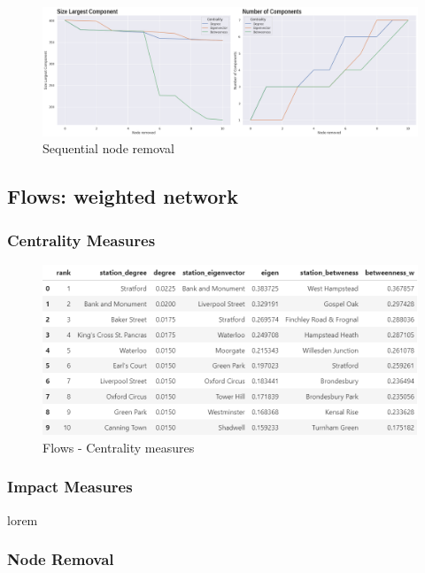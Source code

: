 \documentclass[10pt]{report}
\numberwithin{figure}{section}
\numberwithin{table}{section}
\begin{document}
    \begin{figure}[htp]
        \centering
        \includegraphics[width=16cm]{Image/Part1_sequential_Summarise.png}
        \caption{Sequential node removal}
        \label{fig:galaxy}
    \end{figure}


\newpage

\subsection{Flows: weighted network} 

\subsubsection{Centrality Measures } 

    \begin{figure}[htp]
        \centering
        \includegraphics[width=14cm]{Image/Table_CentralitiesMeasures_Flows.png}
        \caption{Flows - Centrality measures}
        \label{fig:galaxy}
    \end{figure}


\subsubsection{Impact Measures} 
lorem

\subsubsection{Node Removal} 
\end{document}
